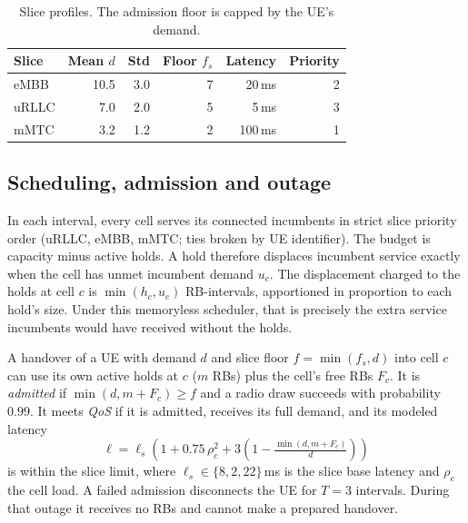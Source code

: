 \documentclass[journal]{IEEEtran}
\begin{document}
\begin{table}[t]
\centering
\caption{Slice profiles. The admission floor is capped by the UE's demand.}
\label{tab:slices}
\begin{tabular}{lrrrrr}
\toprule
Slice & Mean $d$ & Std & Floor $f_s$ & Latency & Priority\\
\midrule
eMBB & 10.5 & 3.0 & 7 & 20\,ms & 2\\
uRLLC & 7.0 & 2.0 & 5 & 5\,ms & 3\\
mMTC & 3.2 & 1.2 & 2 & 100\,ms & 1\\
\bottomrule
\end{tabular}
\end{table}

\subsection{Scheduling, admission and outage}
In each interval, every cell serves its connected incumbents in strict slice priority order (uRLLC, eMBB, mMTC; ties broken by UE identifier). The budget is capacity minus active holds. A hold therefore displaces incumbent service exactly when the cell has unmet incumbent demand $u_c$. The displacement charged to the holds at cell $c$ is $\min(h_c,u_c)$ RB-intervals, apportioned in proportion to each hold's size. Under this memoryless scheduler, that is precisely the extra service incumbents would have received without the holds.

A handover of a UE with demand $d$ and slice floor $f=\min(f_s,d)$ into cell $c$ can use its own active holds at $c$ ($m$ RBs) plus the cell's free RBs $F_c$. It is \emph{admitted} if $\min(d,m+F_c)\ge f$ and a radio draw succeeds with probability $0.99$. It meets \emph{QoS} if it is admitted, receives its full demand, and its modeled latency
\begin{equation}
\ell=\ell_s\left(1+0.75\,\rho_c^2+3\left(1-\tfrac{\min(d,m+F_c)}{d}\right)\right)
\end{equation}
is within the slice limit, where $\ell_s\in\{8,2,22\}$\,ms is the slice base latency and $\rho_c$ the cell load. A failed admission disconnects the UE for $T=3$ intervals. During that outage it receives no RBs and cannot make a prepared handover.
\end{document}
